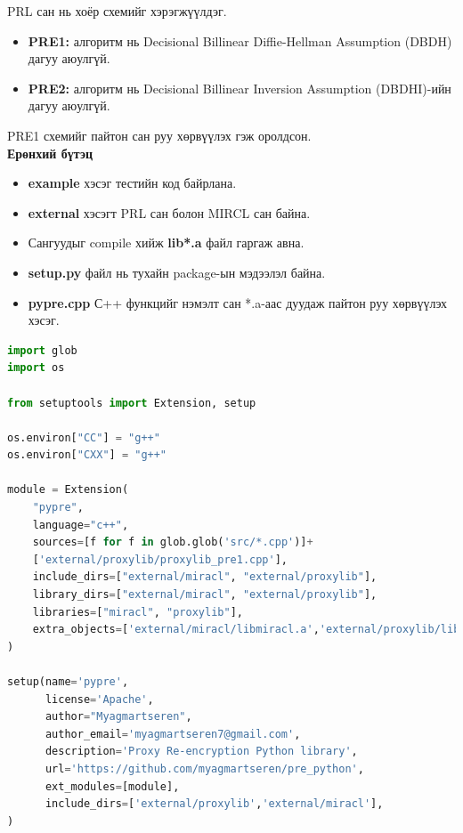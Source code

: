 PRL сан нь хоёр схемийг хэрэгжүүлдэг.
\begin{itemize}
    \item \textbf{PRE1:} алгоритм нь Decisional Billinear Diffie-Hellman Assumption (DBDH) дагуу аюулгүй.
    \item \textbf{PRE2:} алгоритм нь Decisional Billinear Inversion Assumption (DBDHI)-ийн дагуу аюулгүй.
\end{itemize}

PRE1 схемийг пайтон сан руу хөрвүүлэх гэж оролдсон.\\
\textbf{Ерөнхий бүтэц}
\\
\begin{itemize}
    \item \textbf{example} хэсэг тестийн код байрлана.
    \item \textbf{external} хэсэгт PRL сан болон MIRCL сан байна.
    \item Сангуудыг compile хийж \textbf{lib*.a} файл гаргаж авна.
    \item \textbf{setup.py} файл нь тухайн package-ын мэдээлэл байна.
    \item \textbf{pypre.cpp} С++ функцийг нэмэлт сан *.a-аас дуудаж пайтон руу хөрвүүлэх хэсэг. 
\end{itemize}

\begin{lstlisting}[language=Python, caption={setup.py}]
import glob
import os

from setuptools import Extension, setup

os.environ["CC"] = "g++"
os.environ["CXX"] = "g++"

module = Extension(
    "pypre",
    language="c++",
    sources=[f for f in glob.glob('src/*.cpp')]+
    ['external/proxylib/proxylib_pre1.cpp'],
    include_dirs=["external/miracl", "external/proxylib"],
    library_dirs=["external/miracl", "external/proxylib"],
    libraries=["miracl", "proxylib"],
    extra_objects=['external/miracl/libmiracl.a','external/proxylib/libproxylib.a']
)

setup(name='pypre',
      license='Apache',
      author="Myagmartseren",
      author_email='myagmartseren7@gmail.com',
      description='Proxy Re-encryption Python library',
      url='https://github.com/myagmartseren/pre_python',
      ext_modules=[module],
      include_dirs=['external/proxylib','external/miracl'],
)
\end{lstlisting}

